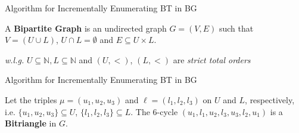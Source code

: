 \begin{frame}[fragile]{Algorithm for Incrementally Enumerating BT in BG}
  \begin{center}
  \large A \textbf{Bipartite Graph} is an undirected graph $G=(V,E)$  such that $V=(U\cup L)$, $U\cap L=\emptyset$ and $E\subseteq U\times L$.
  \end{center}     
  \begin{center}
    \small \emph{w.l.g.} $U \subseteq \mathbb{N}, L \subseteq \mathbb{N}$ and $(U, <)$, $(L, <)$ are \emph{strict total orders}
  \end{center}            
  \begin{figure}
    \centering
  \end{figure}
\end{frame}

\begin{frame}[fragile]{Algorithm for Incrementally Enumerating BT in BG}
  \begin{center}
  Let the triples $\mu=(u_1, u_2, u_3)$ and $\ell=(l_1, l_2,l_3)$ on $U$ and $L$, respectively, i.e.  $\{u_1, u_2, u_3\} \subseteq U$, $\{l_1, l_2,l_3\} \subseteq L$. 
  The 6-cycle $(u_1,l_1,u_2,l_3,u_3,l_2,u_1)$  is a \textbf{Bitriangle} in $G$. 
  \end{center}      
  \begin{figure}
    \centering
  \end{figure}
\end{frame}

